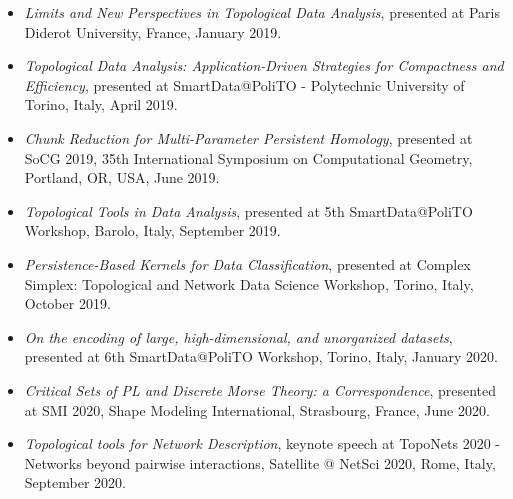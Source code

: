 \documentclass[11pt]{article}
\begin{document}
\begin{itemize}
\item {\em Limits and New Perspectives in Topological Data Analysis}, presented at Paris Diderot University, France, January 2019.

\item {\em Topological Data Analysis: Application-Driven Strategies for Compactness and Efficiency}, presented at SmartData@PoliTO - Polytechnic University of Torino, Italy, April 2019.

\item {\em Chunk Reduction for Multi-Parameter Persistent Homology}, presented at SoCG 2019, 35th International Symposium on Computational Geometry, Portland, OR, USA, June 2019.

\item {\em Topological Tools in Data Analysis}, presented at 5th SmartData@PoliTO Workshop, Barolo, Italy, September 2019.

\item {\em Persistence-Based Kernels for Data Classification}, presented at Complex Simplex: Topological and Network Data Science Workshop, Torino, Italy, October 2019.

\item {\em On the encoding of large, high-dimensional, and unorganized datasets}, presented at 6th SmartData@PoliTO Workshop, Torino, Italy, January 2020.


\item {\em Critical Sets of PL and Discrete Morse Theory: a Correspondence}, presented at SMI 2020, Shape Modeling International, Strasbourg, France, June 2020.


\item {\em Topological tools for Network Description}, keynote speech at TopoNets 2020 - Networks beyond pairwise interactions, Satellite @ NetSci 2020, Rome, Italy, September 2020.


\end{itemize}
\end{document}
